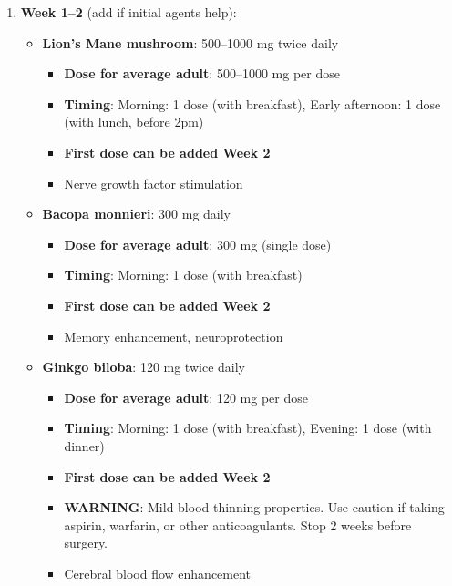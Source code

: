 \begin{enumerate}
\begin{itemize}
        \item \textbf{Rhodiola rosea}: 200--400 mg MORNING ONLY
        \begin{itemize}
            \item \textbf{Dose for average adult}: 200--400 mg (single dose)
            \item \textbf{Timing}: Morning ONLY: 1 dose (with breakfast, 8am). DO NOT take after 12pm - can be stimulating.
            \item \textbf{First dose can be taken tomorrow morning}
            \item Adaptogen with anti-fatigue and focus properties
        \end{itemize}
    \end{itemize}

    \item \textbf{Week 1--2} (add if initial agents help):
    \begin{itemize}
        \item \textbf{Lion's Mane mushroom}: 500--1000 mg twice daily
        \begin{itemize}
            \item \textbf{Dose for average adult}: 500--1000 mg per dose
            \item \textbf{Timing}: Morning: 1 dose (with breakfast), Early afternoon: 1 dose (with lunch, before 2pm)
            \item \textbf{First dose can be added Week 2}
            \item Nerve growth factor stimulation
        \end{itemize}

        \item \textbf{Bacopa monnieri}: 300 mg daily
        \begin{itemize}
            \item \textbf{Dose for average adult}: 300 mg (single dose)
            \item \textbf{Timing}: Morning: 1 dose (with breakfast)
            \item \textbf{First dose can be added Week 2}
            \item Memory enhancement, neuroprotection
        \end{itemize}

        \item \textbf{Ginkgo biloba}: 120 mg twice daily
        \begin{itemize}
            \item \textbf{Dose for average adult}: 120 mg per dose
            \item \textbf{Timing}: Morning: 1 dose (with breakfast), Evening: 1 dose (with dinner)
            \item \textbf{First dose can be added Week 2}
            \item \textbf{WARNING}: Mild blood-thinning properties. Use caution if taking aspirin, warfarin, or other anticoagulants. Stop 2 weeks before surgery.
            \item Cerebral blood flow enhancement
        \end{itemize}


\end{itemize}
\end{enumerate}
